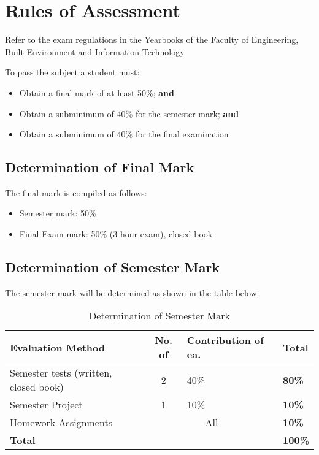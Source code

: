 \section{Rules of Assessment}
    Refer to the exam regulations in the Yearbooks of the Faculty of Engineering,
    Built Environment and Information Technology.

    To pass the subject a student must:
    \begin{itemize}
        \item Obtain a final mark of at least 50\%; {\bf and}
        \item Obtain a subminimum of 40\% for the semester mark; {\bf and}
        \item Obtain a subminimum of 40\% for the final examination
    \end{itemize}

    \subsection{Determination of Final Mark}
        The final mark is compiled as follows:
        \begin{itemize}
            \item Semester mark: 50\%
            \item Final Exam mark: 50\% (3-hour exam), closed-book
        \end{itemize}

    \subsection{Determination of Semester Mark}
        The semester mark will be determined as shown in the table below:
        \begin{table}[!h]
            \begin{center}
             \begin{tabular}{|p{5cm}|c|l|l|}
                 \hline
                 {\bf Evaluation Method} & {\bf No. of} &
                 {\bf Contribution of ea.} & {\bf Total} \\
                 \hline
                 Semester tests (written, closed book)
                    & 2 & 40\% & {\bf 80\%} \\ \hline
                 Semester Project
                    & 1 & 10\% & {\bf 10\%} \\ \hline
                 Homework Assignments
                    & \multicolumn{2}{|c|}{All} & {\bf 10\%} \\
                 \hline
                 \multicolumn{3}{|l|}{{\bf Total}} & {\bf 100\%} \\
                 \hline
             \end{tabular}
             \caption{Determination of Semester Mark}
            \end{center}
        \end{table}

